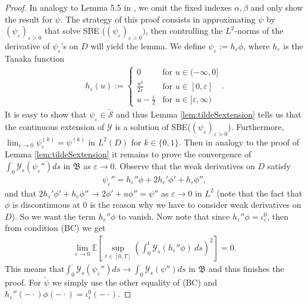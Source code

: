 \documentclass[a4paper, reqno, 12pt]{amsart}
\theoremstyle{plain}
\theoremstyle{definition}
\begin{document}
\begin{proof}
    In analogy to Lemma 5.5 in \cite{BGJS22}, we omit the fixed indexes $\alpha,\beta$ and only show the result for $\psi$. The strategy of this proof consists in approximating $\psi$ by $(\psi_{\varepsilon})_{\varepsilon>0}$ that solve SBE ($(\psi_\varepsilon)_{\varepsilon>0})$, then controlling the $L^2$-norms of the derivative of $\psi_{\varepsilon}$'s on $D$ will yield the lemma. We define $\psi_{\varepsilon} := h_{\varepsilon}\phi$, where $h_{\varepsilon}$ is the Tanaka function
    \begin{align*}
        h_{\varepsilon}(u) := \left\{ \begin{array}{ll}
        0 & \text{for } u\in(-\infty,0] \\
        \frac{u^2}{2\varepsilon}  & \text{for } u\in[0,\varepsilon] \\
        u-\frac{\varepsilon}{2}  & \text{for } u\in[\varepsilon,{\infty})
        \end{array}\right..
    \end{align*}
    It is easy to show that $\psi_{\varepsilon}\in \tilde{\mathcal S}$ and thus Lemma \ref{lem:tildeSextension} tells us that the continuous extension of $\mathcal Y$ is a solution of SBE($(\psi_{\varepsilon})_{\varepsilon>0}$). Furthermore, $\lim_{\varepsilon\to 0}\psi_{\varepsilon}^{(k)} = \psi^{(k)}$ in $L^2(D)$ for $k\in\{0,1\}$. 
    Then in analogy to the proof of Lemma \ref{lem:tildeSextension} it remains to prove the convergence of $\int_0^{\cdot} \mathcal Y_s(\psi_{\varepsilon}'')ds$ in $\mathfrak B$ as $\varepsilon \to 0$. Observe that the weak derivatives on $D$ satisfy
    \begin{align*}
        \psi_{\varepsilon}''  = h_{\varepsilon}'' \phi + 2h_{\varepsilon}' \phi' + h_{\varepsilon}\phi'',
    \end{align*}
    and that $2h_{\varepsilon}' \phi' + h_{\varepsilon}\phi'' \to 2\phi' + u \phi''= \psi''$ as  
    $\varepsilon \to 0$ in $L^2$ (note that the fact that $\phi$ is discontinuous at $0$ is the reason why we have to consider weak derivatives on $D$). So we want the term $h_{\varepsilon}'' \phi$ to vanish. Now note that since $h_{\varepsilon}'' \phi = \iota_{\varepsilon}^0 $, then  from condition (BC)  we get
    \begin{align*}
        \lim_{\varepsilon\to 0 } \mathbb{E}\left[\sup_{t\in[0,T]} \left(\int_0^t \mathcal Y_s(h_{\varepsilon}'' \phi) \ ds\right)^2 \right] = 0.
    \end{align*}
    This means that$\int_0^{\cdot} \mathcal Y_s(\psi_{\varepsilon}'')ds \to \int_0^{\cdot} \mathcal Y_s(\psi'') ds$  in $\mathfrak B$ and thus finishes the proof. For $\check\psi$ we simply use the other equality of (BC) and $h_{\varepsilon}''(-\cdot) \phi(-\cdot) = \iota_{\varepsilon}^0(-\cdot) $. 
\end{proof}
\end{document}
